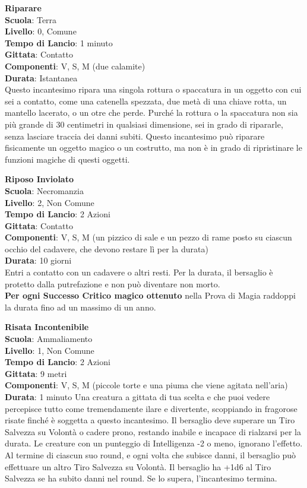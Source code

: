 \begin{multicols}{2}
\medskip\textbf{Riparare}\\
\textbf{Scuola}: Terra\\
\textbf{Livello}: 0, Comune\\
\textbf{Tempo di Lancio}: 1 minuto\\
\textbf{Gittata}: Contatto\\
\textbf{Componenti}: V, S, M (due calamite)\\
\textbf{Durata}: Istantanea\\
Questo incantesimo ripara una singola rottura o spaccatura in un oggetto con cui sei a contatto, come una catenella spezzata, due metà di una chiave rotta, un mantello lacerato, o un otre che perde. Purché la rottura o la spaccatura non sia più grande di 30 centimetri in qualsiasi dimensione, sei in grado di ripararle, senza lasciare traccia dei danni subiti. Questo incantesimo può riparare fisicamente un oggetto magico o un costrutto, ma non è in grado di ripristinare le funzioni magiche di questi oggetti.

\medskip\textbf{Riposo Inviolato}\\
\textbf{Scuola}: Necromanzia\\
\textbf{Livello}: 2, Non Comune\\
\textbf{Tempo di Lancio}: 2 Azioni\\
\textbf{Gittata}: Contatto\\
\textbf{Componenti}: V, S, M (un pizzico di sale e un pezzo di rame posto su ciascun occhio del cadavere, che devono restare lì per la durata)\\
\textbf{Durata}: 10 giorni\\
Entri a contatto con un cadavere o altri resti. Per la durata, il bersaglio è protetto dalla putrefazione e non può diventare non morto. \\
\textbf{Per ogni Successo Critico magico ottenuto} nella Prova di Magia raddoppi la durata fino ad un massimo di un anno.

\medskip\textbf{Risata Incontenibile}\\
\textbf{Scuola}: Ammaliamento\\
\textbf{Livello}: 1, Non Comune\\
\textbf{Tempo di Lancio}: 2 Azioni\\
\textbf{Gittata}: 9 metri\\
\textbf{Componenti}: V, S, M (piccole torte e una piuma che viene agitata nell'aria)\\
\textbf{Durata}: 1 minuto
Una creatura a gittata di tua scelta e che puoi vedere percepisce tutto come tremendamente ilare e divertente, scoppiando in fragorose risate finché è soggetta a questo incantesimo. Il bersaglio deve superare un Tiro Salvezza su Volontà o cadere prono, restando inabile e incapace di rialzarsi per la durata. Le creature con un punteggio di Intelligenza -2 o meno, ignorano l'effetto.\\
Al termine di ciascun suo round, e ogni volta che subisce danni, il bersaglio può effettuare un altro Tiro Salvezza su Volontà. Il bersaglio ha +1d6 al Tiro Salvezza se ha subito danni nel round. Se lo supera, l'incantesimo termina.


\end{multicols}
